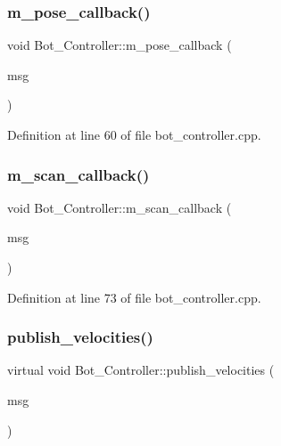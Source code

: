 \subsubsection{\texorpdfstring{m\+\_\+pose\+\_\+callback()}{m\_pose\_callback()}}
{\footnotesize\ttfamily void Bot\+\_\+\+Controller\+::m\+\_\+pose\+\_\+callback (\begin{DoxyParamCaption}\item[{const nav\+\_\+msgs\+::\+Odometry\+::\+Const\+Ptr \&}]{msg }\end{DoxyParamCaption})\hspace{0.3cm}{\ttfamily [protected]}}



Definition at line 60 of file bot\+\_\+controller.\+cpp.

\mbox{\label{class_bot___controller_ae7a0c2b3a9a5adc3464dc581003c3ce1}} 
\subsubsection{\texorpdfstring{m\+\_\+scan\+\_\+callback()}{m\_scan\_callback()}}
{\footnotesize\ttfamily void Bot\+\_\+\+Controller\+::m\+\_\+scan\+\_\+callback (\begin{DoxyParamCaption}\item[{const sensor\+\_\+msgs\+::\+Laser\+Scan\+::\+Const\+Ptr \&}]{msg }\end{DoxyParamCaption})\hspace{0.3cm}{\ttfamily [protected]}}



Definition at line 73 of file bot\+\_\+controller.\+cpp.

\mbox{\label{class_bot___controller_ae357ee9ea3ec7a5000f39532fc52fa72}} 
\subsubsection{\texorpdfstring{publish\+\_\+velocities()}{publish\_velocities()}}
{\footnotesize\ttfamily virtual void Bot\+\_\+\+Controller\+::publish\+\_\+velocities (\begin{DoxyParamCaption}\item[{const geometry\+\_\+msgs\+::\+Twist \&}]{msg }\end{DoxyParamCaption})\hspace{0.3cm}{\ttfamily [pure virtual]}}



